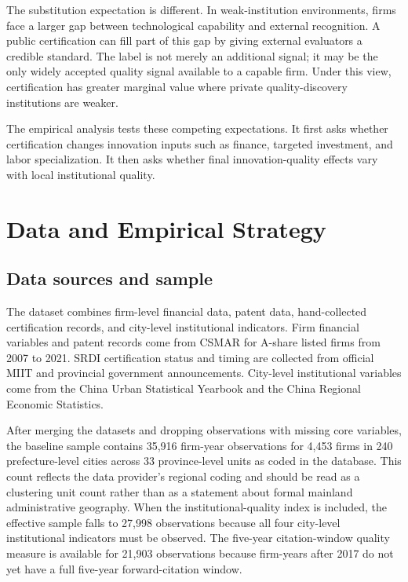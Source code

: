 \documentclass[12pt]{article}
\begin{document}
The substitution expectation is different. In weak-institution environments, firms face a larger gap between technological capability and external recognition. A public certification can fill part of this gap by giving external evaluators a credible standard. The label is not merely an additional signal; it may be the only widely accepted quality signal available to a capable firm. Under this view, certification has greater marginal value where private quality-discovery institutions are weaker.

The empirical analysis tests these competing expectations. It first asks whether certification changes innovation inputs such as finance, targeted investment, and labor specialization. It then asks whether final innovation-quality effects vary with local institutional quality.

\section{Data and Empirical Strategy}

\subsection{Data sources and sample}

The dataset combines firm-level financial data, patent data, hand-collected certification records, and city-level institutional indicators. Firm financial variables and patent records come from CSMAR for A-share listed firms from 2007 to 2021. SRDI certification status and timing are collected from official MIIT and provincial government announcements. City-level institutional variables come from the China Urban Statistical Yearbook and the China Regional Economic Statistics.

After merging the datasets and dropping observations with missing core variables, the baseline sample contains 35,916 firm-year observations for 4,453 firms in 240 prefecture-level cities across 33 province-level units as coded in the database. This count reflects the data provider's regional coding and should be read as a clustering unit count rather than as a statement about formal mainland administrative geography. When the institutional-quality index is included, the effective sample falls to 27,998 observations because all four city-level institutional indicators must be observed. The five-year citation-window quality measure is available for 21,903 observations because firm-years after 2017 do not yet have a full five-year forward-citation window.
\end{document}
